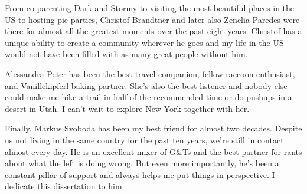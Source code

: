 From co-parenting Dark and Stormy to visiting the most beautiful places in the US to hosting pie parties, Christof Brandtner and later also Zenelia Paredes were there for almost all the greatest moments over the past eight years. Christof has a unique ability to create a community wherever he goes and my life in the US would not have been filled with as many great people without him.

Alessandra Peter has been the best travel companion, fellow raccoon enthusiast, and Vanillekipferl baking partner. She's also the best listener and nobody else could make me hike a trail in half of the recommended time or do pushups in a desert in Utah. I can't wait to explore New York together with her.

Finally, Markus Svoboda has been my best friend for almost two decades. Despite us not living in the same country for the past ten years, we're still in contact almost every day. He is an excellent mixer of G\&Ts and the best partner for rants about what the left is doing wrong. But even more importantly, he's been a constant pillar of support and always helps me put things in perspective. I dedicate this dissertation to him.
